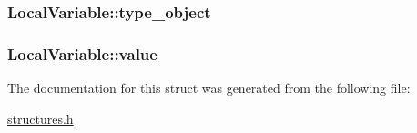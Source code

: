 \subsubsection[{\texorpdfstring{type\+\_\+object}{type_object}}]{ Local\+Variable\+::type\+\_\+object}\hypertarget{structLocalVariable_ae6f28a6c3ea7313de860a8e46adf661f}{}\label{structLocalVariable_ae6f28a6c3ea7313de860a8e46adf661f}
\subsubsection[{\texorpdfstring{value}{value}}]{ Local\+Variable\+::value}\hypertarget{structLocalVariable_aee58138d840bf24f71cd8c4fd2f84db7}{}\label{structLocalVariable_aee58138d840bf24f71cd8c4fd2f84db7}


The documentation for this struct was generated from the following file\+:\begin{DoxyCompactItemize}
\item 
\hyperlink{structures_8h}{structures.\+h}\end{DoxyCompactItemize}
